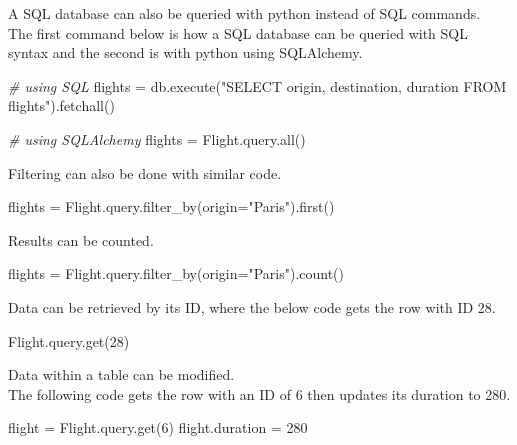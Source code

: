 \documentclass[]{book}
\newenvironment{Shaded}{\begin{snugshade}}{\end{snugshade}}
\newcommand{\CommentTok}[1]{\textcolor[rgb]{0.56,0.35,0.01}{\textit{#1}}}
\newcommand{\ExtensionTok}[1]{#1}
\newcommand{\NormalTok}[1]{#1}
\newcommand{\StringTok}[1]{\textcolor[rgb]{0.31,0.60,0.02}{#1}}
\begin{document}
A SQL database can also be queried with python instead of SQL commands.\\
The first command below is how a SQL database can be queried with SQL syntax and the second is with python using SQLAlchemy.

\begin{Shaded}
\begin{Highlighting}[]
\CommentTok{# using SQL}
\ExtensionTok{flights}\NormalTok{ = db.execute(}\StringTok{"SELECT origin, destination, duration FROM flights"}\NormalTok{)}\ExtensionTok{.fetchall}\NormalTok{()}

\CommentTok{# using SQLAlchemy}
\ExtensionTok{flights}\NormalTok{ = Flight.query.all()}
\end{Highlighting}
\end{Shaded}

Filtering can also be done with similar code.

\begin{Shaded}
\begin{Highlighting}[]
\ExtensionTok{flights}\NormalTok{ = Flight.query.filter_by(origin=}\StringTok{"Paris"}\NormalTok{)}\ExtensionTok{.first}\NormalTok{()}
\end{Highlighting}
\end{Shaded}

Results can be counted.

\begin{Shaded}
\begin{Highlighting}[]
\ExtensionTok{flights}\NormalTok{ = Flight.query.filter_by(origin=}\StringTok{"Paris"}\NormalTok{)}\ExtensionTok{.count}\NormalTok{()}
\end{Highlighting}
\end{Shaded}

Data can be retrieved by its ID, where the below code gets the row with ID 28.

\begin{Shaded}
\begin{Highlighting}[]
\ExtensionTok{Flight.query.get}\NormalTok{(28)}
\end{Highlighting}
\end{Shaded}

Data within a table can be modified.\\
The following code gets the row with an ID of 6 then updates its duration to 280.

\begin{Shaded}
\begin{Highlighting}[]
\ExtensionTok{flight}\NormalTok{ = Flight.query.get(6)}
\ExtensionTok{flight.duration}\NormalTok{ = 280}
\end{Highlighting}
\end{Shaded}
\end{document}
